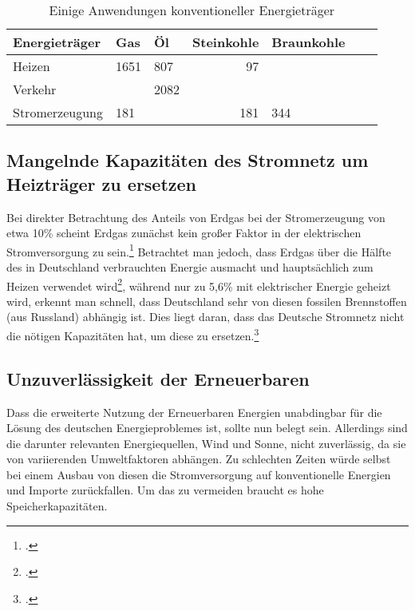 \documentclass[12pt]{article}
\begin{document}
    \begin{table}
        \centering
        \begin{tabular}{lllrlll}
            \toprule
            \textbf{Energieträger} & \textbf{Gas} & \textbf{Öl} & \textbf{Steinkohle} & \textbf{Braunkohle} \\
            \midrule
            Heizen                 & 1651         & 807         & 97                  &                     \\
            Verkehr                &              & 2082        &                     &                     \\
            Stromerzeugung         & 181          &             & 181                 & 344                 \\
            \bottomrule
        \end{tabular}
        \caption{Einige Anwendungen konventioneller Energieträger}
        \label{tab:}
    \end{table}

    \subsection{Mangelnde Kapazitäten des Stromnetz um Heizträger zu ersetzen}
    Bei direkter Betrachtung des Anteils von Erdgas bei der Stromerzeugung von etwa 10\% scheint Erdgas zunächst
    kein großer Faktor in der elektrischen Stromversorgung zu sein.\footcite{SMARDHoherEEAnteil, EnergieWofurErdgas}
    Betrachtet man jedoch, dass Erdgas über die Hälfte des in Deutschland verbrauchten
    Energie ausmacht und hauptsächlich zum Heizen verwendet wird\footcite{Anwendungsbereiche, EnergieWofurErdgas},
    während nur zu 5,6\% mit elektrischer Energie geheizt wird, erkennt man schnell, dass Deutschland sehr von diesen
    fossilen Brennstoffen (aus Russland) abhängig ist.
    Dies liegt daran, dass das Deutsche Stromnetz nicht die nötigen Kapazitäten hat, um diese zu
    ersetzen.\footcite{EnergieWofurErdgas}

    \subsection{Unzuverlässigkeit der Erneuerbaren}
    Dass die erweiterte Nutzung der Erneuerbaren Energien unabdingbar für die Lösung des deutschen Energieproblemes
    ist, sollte nun belegt sein. Allerdings sind die darunter relevanten Energiequellen, Wind und Sonne, nicht
    zuverlässig, da sie von variierenden Umweltfaktoren abhängen. Zu schlechten Zeiten würde selbst bei einem Ausbau
    von diesen die Stromversorgung auf konventionelle Energien und Importe zurückfallen. Um das zu vermeiden braucht
    es hohe Speicherkapazitäten.
\end{document}
